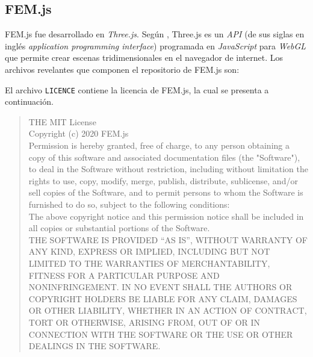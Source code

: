 \subsection{FEM.js}

FEM.js fue desarrollado en \emph{Three.js}. Según \cite{dirksen2015threejs}, Three.js es un \emph{API} (de sus siglas en inglés \emph{application programming interface}) programada en \emph{JavaScript} para \emph{WebGL} que permite crear escenas tridimensionales en el navegador de internet. Los archivos revelantes que componen el repositorio de FEM.js son:
\bigskip

  
\bigskip

El archivo \verb|LICENCE| contiene la licencia de FEM.js, la cual se presenta a continuación.

\begin{quotation}
  THE MIT License\\

  Copyright (c) 2020 FEM.js\\

  Permission is hereby granted, free of charge, to any person obtaining a copy of this software and associated documentation files (the "Software"), to deal in the Software without restriction, including without limitation the rights to use, copy, modify, merge, publish, distribute, sublicense, and/or sell copies of the Software, and to permit persons to whom the Software is furnished to do so, subject to the following conditions:\\
  
  The above copyright notice and this permission notice shall be included in all copies or substantial portions of the Software.\\

  THE SOFTWARE IS PROVIDED ``AS IS'', WITHOUT WARRANTY OF ANY KIND, EXPRESS OR IMPLIED, INCLUDING BUT NOT LIMITED TO THE WARRANTIES OF MERCHANTABILITY, FITNESS FOR A PARTICULAR PURPOSE AND NONINFRINGEMENT. IN NO EVENT SHALL THE AUTHORS OR COPYRIGHT HOLDERS BE LIABLE FOR ANY CLAIM, DAMAGES OR OTHER LIABILITY, WHETHER IN AN ACTION OF CONTRACT, TORT OR OTHERWISE, ARISING FROM, OUT OF OR IN CONNECTION WITH THE SOFTWARE OR THE USE OR OTHER DEALINGS IN THE SOFTWARE.
\end{quotation}

